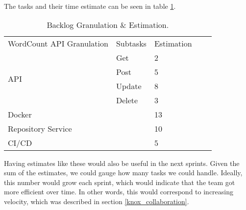 The tasks and their time estimate can be seen in table \ref{BacklogEstimationSprint3}.
\begin{table}[h]
\centering
\begin{tabular}{|l|l|l|ll}
\cline{1-3}
WordCount API Granulation   & Subtasks & Estimation &  &  \\ \cline{1-3}
\multirow{4}{*}{API} 		& Get      & 2          &  &  \\ \cline{2-3}
                            & Post     & 5          &  &  \\ \cline{2-3}
                            & Update   & 8          &  &  \\ \cline{2-3}
                            & Delete   & 3          &  &  \\ \cline{1-3}
Docker                      &          & 13         &  &  \\ \cline{1-3}
Repository Service          &          & 10         &  &  \\ \cline{1-3}
CI/CD                       &          & 5          &  &  \\ \cline{1-3}
\end{tabular}
\caption{Backlog Granulation \& Estimation.}
\label{BacklogEstimationSprint3}
\end{table}

Having estimates like these would also be useful in the next sprints. Given the sum of the estimates, we could gauge how many tasks we could handle. Ideally, this number would grow each sprint, which would indicate that the team got more efficient over time. In other words, this would correspond to increasing velocity, which was described in section \ref{knox_collaboration}.